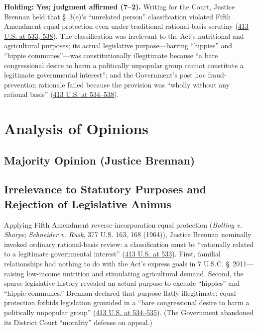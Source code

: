 \documentclass[12pt]{article}
\begin{document}
\textbf{Holding:} \textbf{Yes; judgment affirmed (7--2).} Writing for the Court, Justice Brennan held that \S~3(e)'s ``unrelated person'' classification violated Fifth Amendment equal protection even under traditional rational-basis scrutiny (\href{https://supreme.justia.com/cases/federal/us/413/528/}{413 U.S. at 533, 538}). The classification was irrelevant to the Act's nutritional and agricultural purposes; its actual legislative purpose---barring ``hippies'' and ``hippie communes''---was constitutionally illegitimate because ``a bare congressional desire to harm a politically unpopular group cannot constitute a legitimate governmental interest''; and the Government's post hoc fraud-prevention rationale failed because the provision was ``wholly without any rational basis'' (\href{https://supreme.justia.com/cases/federal/us/413/528/}{413 U.S. at 534--538}).

\section{Analysis of Opinions}
\subsection{Majority Opinion (Justice Brennan)}

\subsection{Irrelevance to Statutory Purposes and Rejection of Legislative Animus}

Applying Fifth Amendment reverse-incorporation equal protection (\textit{Bolling v. Sharpe}; \textit{Schneider v. Rusk}, 377 U.S. 163, 168 (1964)), Justice Brennan nominally invoked ordinary rational-basis review: a classification must be ``rationally related to a legitimate governmental interest'' (\href{https://supreme.justia.com/cases/federal/us/413/528/}{413 U.S. at 533}). First, familial relationships had nothing to do with the Act's express goals in 7 U.S.C. \S~2011---raising low-income nutrition and stimulating agricultural demand. Second, the sparse legislative history revealed an actual purpose to exclude ``hippies'' and ``hippie communes.'' Brennan declared that purpose flatly illegitimate: equal protection forbids legislation grounded in a ``bare congressional desire to harm a politically unpopular group'' (\href{https://supreme.justia.com/cases/federal/us/413/528/}{413 U.S. at 534--535}). (The Government abandoned its District Court ``morality'' defense on appeal.)
\end{document}
